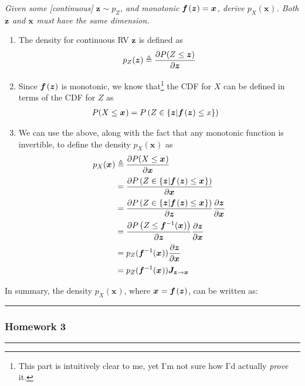 \documentclass[11pt]{article}
\renewcommand\vec[2][]{\bm{#2}_{#1}}
\newcommand\subsub[1]{\Needspace{15\baselineskip}\hrule\subsubsection{#1}\hrule}
\begin{document}
\begin{example}
	\textit{Given some [continuous] $\vec z \sim p_Z$, and monotonic $\vecfn{f}{z} = \vec x$, derive $p_X(\vec x)$. Both $\vec z$ and $\vec x$ must have the same dimension.}
	\tcblower
	
	\begin{enumerate}
		\item The density for continuous RV $\vec z$ is defined as
		\begin{align}
		p_Z(\vec z) \triangleq \pderiv{P(Z \le \vec z)}{\vec z}
		\end{align}
		
		\item Since $\vecfn{f}{z}$ is monotonic, we know that\footnote{This part is intuitively clear to me, yet I'm not sure how I'd actually \textit{prove} it.} the CDF for $X$ can be defined in terms of the CDF for $Z$ as
		\begin{align}
		P(X \le \vec x)
		&= P\lr{  Z \in \{  \vec z | \vecfn{f}{z} \le x  \}  }
		\end{align}
		
		\item We can use the above, along with the fact that any monotonic function is invertible, to define the density $p_X(\vec x)$ as
		\begin{align}
		p_X(\vec x)
		&\triangleq \pderiv{P(X \le \vec x) }{\vec x} \\
		&= \pderiv{ P\lr{  Z \in \{  \vec z | \vecfn{f}{z} \le \vec x \}  } }{\vec x} \\
		&= \pderiv{ P\lr{  Z \in \{  \vec z | \vecfn{f}{z} \le \vec x  \}  } }{\vec z} \pderiv{\vec z}{\vec x} \\
		&= \pderiv{ P\lr{  Z  \le \vinv{f}(\vec x)  } }{\vec z} \pderiv{\vec z}{\vec x} \\
		&= p_Z(\vinv{f}(\vec x)) \pderiv{\vec z}{\vec x} \\
		&=p_Z(\vinv{f}(\vec x)) \matr[\vec z \rightarrow \vec x]{J}
		\end{align}
	\end{enumerate}
	
	In summary, the density $p_X(\vec x)$, where $\vec x = \vecfn{f}{z}$, can be written as:
	\graybox{
		p_X(\vec x)
		&= p_Z\lr{\vec z \eq \vinv{f}(\vec x)}
	}
	
\end{example}


\clearpage
\subsub{Homework 3}
\end{document}
